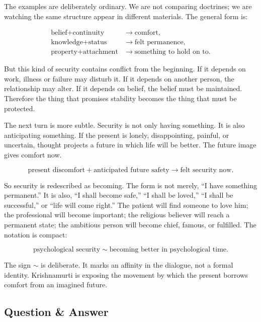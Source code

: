 The examples are deliberately ordinary. We are not comparing doctrines; we are watching the same structure appear in different materials. The general form is:

\begin{align}
\text{belief}+\text{continuity} &\longrightarrow \text{comfort}, \\
\text{knowledge}+\text{status} &\longrightarrow \text{felt permanence}, \\
\text{property}+\text{attachment} &\longrightarrow \text{something to hold on to}.
\end{align}

But this kind of security contains conflict from the beginning. If it depends on work, illness or failure may disturb it. If it depends on another person, the relationship may alter. If it depends on belief, the belief must be maintained. Therefore the thing that promises stability becomes the thing that must be protected.

The next turn is more subtle. Security is not only having something. It is also anticipating something. If the present is lonely, disappointing, painful, or uncertain, thought projects a future in which life will be better. The future image gives comfort now.

\begin{equation}
\text{present discomfort}
+
\text{anticipated future safety}
\longrightarrow
\text{felt security now}.
\end{equation}

So security is redescribed as becoming. The form is not merely, ``I have something permanent.'' It is also, ``I shall become safe,'' ``I shall be loved,'' ``I shall be successful,'' or ``life will come right.'' The patient will find someone to love him; the professional will become important; the religious believer will reach a permanent state; the ambitious person will become chief, famous, or fulfilled. The notation is compact:

\begin{equation}
\text{psychological security}
\sim
\text{becoming better in psychological time}.
\end{equation}

The sign \(\sim\) is deliberate. It marks an affinity in the dialogue, not a formal identity. Krishnamurti is exposing the movement by which the present borrows comfort from an imagined future.

\subsection{Question \& Answer}

